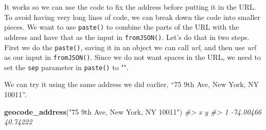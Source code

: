 \documentclass[
  12pt,
]{book}
\newenvironment{Shaded}{\begin{snugshade}}{\end{snugshade}}
\newcommand{\CommentTok}[1]{\textcolor[rgb]{0.56,0.35,0.01}{\textit{#1}}}
\newcommand{\ControlFlowTok}[1]{\textcolor[rgb]{0.13,0.29,0.53}{\textbf{#1}}}
\newcommand{\DataTypeTok}[1]{\textcolor[rgb]{0.13,0.29,0.53}{#1}}
\newcommand{\DecValTok}[1]{\textcolor[rgb]{0.00,0.00,0.81}{#1}}
\newcommand{\KeywordTok}[1]{\textcolor[rgb]{0.13,0.29,0.53}{\textbf{#1}}}
\newcommand{\NormalTok}[1]{#1}
\newcommand{\OperatorTok}[1]{\textcolor[rgb]{0.81,0.36,0.00}{\textbf{#1}}}
\newcommand{\StringTok}[1]{\textcolor[rgb]{0.31,0.60,0.02}{#1}}
\begin{document}
It works so we can use the code to fix the address before putting it in the URL. To avoid having very long lines of code, we can break down the code into smaller pieces. We want to use \texttt{paste()} to combine the parts of the URL with the address and have that as the input in \texttt{fromJSON()}. Let's do that in two steps. First we do the \texttt{paste()}, saving it in an object we can call \emph{url}, and then use \emph{url} as our input in \texttt{fromJSON()}. Since we do not want spaces in the URL, we need to set the \texttt{sep} parameter in \texttt{paste()} to "".

\begin{Shaded}
\end{Shaded}

We can try it using the same address we did earlier, ``75 9th Ave, New York, NY 10011''.

\begin{Shaded}
\begin{Highlighting}[]
\KeywordTok{geocode\_address}\NormalTok{(}\StringTok{"75 9th Ave, New York, NY 10011"}\NormalTok{)}
\CommentTok{\#>           x        y}
\CommentTok{\#> 1 {-}74.00466 40.74222}
\end{Highlighting}
\end{Shaded}
\end{document}
